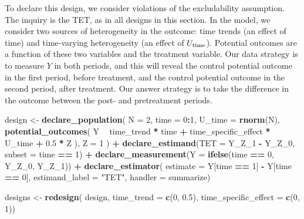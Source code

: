 \documentclass[
]{article}
\newenvironment{Shaded}{\begin{snugshade}}{\end{snugshade}}
\newcommand{\DataTypeTok}[1]{\textcolor[rgb]{0.13,0.29,0.53}{#1}}
\newcommand{\DecValTok}[1]{\textcolor[rgb]{0.00,0.00,0.81}{#1}}
\newcommand{\FloatTok}[1]{\textcolor[rgb]{0.00,0.00,0.81}{#1}}
\newcommand{\KeywordTok}[1]{\textcolor[rgb]{0.13,0.29,0.53}{\textbf{#1}}}
\newcommand{\NormalTok}[1]{#1}
\newcommand{\OperatorTok}[1]{\textcolor[rgb]{0.81,0.36,0.00}{\textbf{#1}}}
\newcommand{\StringTok}[1]{\textcolor[rgb]{0.31,0.60,0.02}{#1}}
\begin{document}
To declare this design, we consider violations of the excludability
assumption. The inquiry is the TET, as in all designs in this section.
In the model, we consider two sources of heterogeneity in the outcome:
time trends (an effect of time) and time-varying heterogeneity (an
effect of \(U_{\rm time}\)). Potential outcomes are a function of these
two variables and the treatment variable. Our data strategy is to
measure \(Y\) in both periods, and this will reveal the control
potential outcome in the first period, before treatment, and the control
potential outcome in the second period, after treatment. Our answer
strategy is to take the difference in the outcome between the post- and
pretreatment periods.

\begin{Shaded}
\begin{Highlighting}[]
\NormalTok{design <-}\StringTok{ }
\StringTok{  }\KeywordTok{declare_population}\NormalTok{(}
    \DataTypeTok{N =} \DecValTok{2}\NormalTok{, }
    \DataTypeTok{time =} \DecValTok{0}\OperatorTok{:}\DecValTok{1}\NormalTok{,}
    \DataTypeTok{U_time =} \KeywordTok{rnorm}\NormalTok{(N),}
    \KeywordTok{potential_outcomes}\NormalTok{(}
\NormalTok{      Y }\OperatorTok{~}\StringTok{ }\NormalTok{time_trend }\OperatorTok{*}\StringTok{ }\NormalTok{time }\OperatorTok{+}\StringTok{ }\NormalTok{time_specific_effect }\OperatorTok{*}\StringTok{ }\NormalTok{U_time }\OperatorTok{+}\StringTok{ }\FloatTok{0.5} \OperatorTok{*}\StringTok{ }\NormalTok{Z}
\NormalTok{    ),}
    \DataTypeTok{Z =} \DecValTok{1}
\NormalTok{  ) }\OperatorTok{+}\StringTok{ }
\StringTok{  }\KeywordTok{declare_estimand}\NormalTok{(}\DataTypeTok{TET =}\NormalTok{ Y_Z_}\DecValTok{1} \OperatorTok{-}\StringTok{ }\NormalTok{Y_Z_}\DecValTok{0}\NormalTok{, }\DataTypeTok{subset =}\NormalTok{ time }\OperatorTok{==}\StringTok{ }\DecValTok{1}\NormalTok{) }\OperatorTok{+}\StringTok{ }
\StringTok{  }\KeywordTok{declare_measurement}\NormalTok{(}\DataTypeTok{Y =} \KeywordTok{ifelse}\NormalTok{(time }\OperatorTok{==}\StringTok{ }\DecValTok{0}\NormalTok{, Y_Z_}\DecValTok{0}\NormalTok{, Y_Z_}\DecValTok{1}\NormalTok{)) }\OperatorTok{+}\StringTok{ }
\StringTok{  }\KeywordTok{declare_estimator}\NormalTok{(}
    \DataTypeTok{estimate =}\NormalTok{ Y[time }\OperatorTok{==}\StringTok{ }\DecValTok{1}\NormalTok{] }\OperatorTok{-}\StringTok{ }\NormalTok{Y[time }\OperatorTok{==}\StringTok{ }\DecValTok{0}\NormalTok{], }
    \DataTypeTok{estimand_label =} \StringTok{"TET"}\NormalTok{, }\DataTypeTok{handler =}\NormalTok{ summarize)}

\NormalTok{designs <-}\StringTok{ }\KeywordTok{redesign}\NormalTok{(}
\NormalTok{  design, }\DataTypeTok{time_trend =} \KeywordTok{c}\NormalTok{(}\DecValTok{0}\NormalTok{, }\FloatTok{0.5}\NormalTok{), }\DataTypeTok{time_specific_effect =} \KeywordTok{c}\NormalTok{(}\DecValTok{0}\NormalTok{, }\DecValTok{1}\NormalTok{))}
\end{Highlighting}
\end{Shaded}
\end{document}
